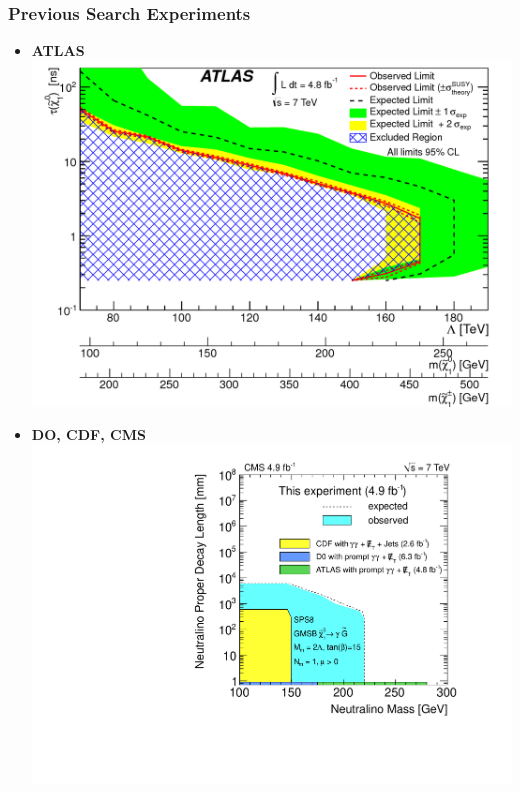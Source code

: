 \documentclass{beamer}
\begin{document}
\begin{frame}
\frametitle{Previous Search Experiments}
\begin{minipage}[t]{0.82\paperwidth}
 \begin{itemize}
  \item \textcolor{UMN@Maroon}{\textbf{ATLAS}}
  \includegraphics[height=0.35\textwidth,width=0.90\linewidth]{THESISPLOTS/ATLAS_Upper_Limit.png}

 \end{itemize}
\end{minipage}
\begin{minipage}[b]{0.82\paperwidth}
\begin{itemize}
  \item \textcolor{UMN@Maroon}{\textbf{DO, CDF, CMS}}
\includegraphics[height=0.35\textwidth,width=0.95\linewidth]{THESISPLOTS/2D_exclusion.pdf}

  \end{itemize}
\end{minipage}
\end{frame}
\end{document}
